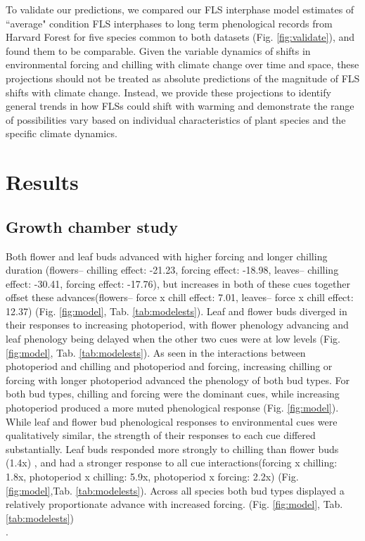 \documentclass[11pt]{article}\usepackage[]{graphicx}\usepackage[]{color}
\begin{document}
\noindent To validate our predictions, we compared our FLS interphase model estimates of ``average" condition FLS interphases to long term phenological records from Harvard Forest \citep{OKeefe2015} for five species common to both datasets (Fig. \ref{fig:validate}), and found them to be comparable. Given the variable dynamics of shifts in environmental forcing and chilling with climate change over time and space, these projections should not be treated as absolute predictions of the magnitude of FLS shifts with climate change. Instead, we provide these projections to identify general trends in how FLSs could shift with warming and demonstrate the range of possibilities vary based on individual characteristics of plant species and the specific climate dynamics.\\

\section*{Results} 
\subsection*{Growth chamber study} 
\noindent  Both flower and leaf buds advanced with higher forcing and longer chilling duration (flowers-- chilling effect: -21.23, forcing effect: -18.98, leaves-- chilling effect: -30.41, forcing effect: -17.76), but increases in both of these cues together offset these advances(flowers-- force x chill effect: 7.01, leaves-- force x chill effect: 12.37) (Fig. \ref{fig:model}, Tab. \ref{tab:modelests}). Leaf and flower buds diverged in their responses to increasing photoperiod, with flower phenology advancing and leaf phenology being delayed when the other two cues were at low levels (Fig. \ref{fig:model}, Tab. \ref{tab:modelests}). As seen in the interactions between photoperiod and chilling and photoperiod and forcing, increasing chilling or forcing with longer photoperiod advanced the phenology of both bud types. For both bud types, chilling and forcing were the dominant cues, while increasing photoperiod produced a more muted phenological response (Fig. \ref{fig:model}). \\

\noindent While leaf and flower bud phenological responses to environmental cues were qualitatively similar, the strength of their responses to each cue differed substantially. Leaf buds responded more strongly to chilling than flower buds (1.4x) , and had a stronger response to all cue interactions(forcing x chilling: 1.8x, photoperiod x chilling: 5.9x, photoperiod x forcing: 2.2x) (Fig. \ref{fig:model},Tab. \ref{tab:modelests}). Across all species both bud types displayed a relatively proportionate advance with increased forcing. (Fig. \ref{fig:model}, Tab. \ref{tab:modelests})\\.
\end{document}
